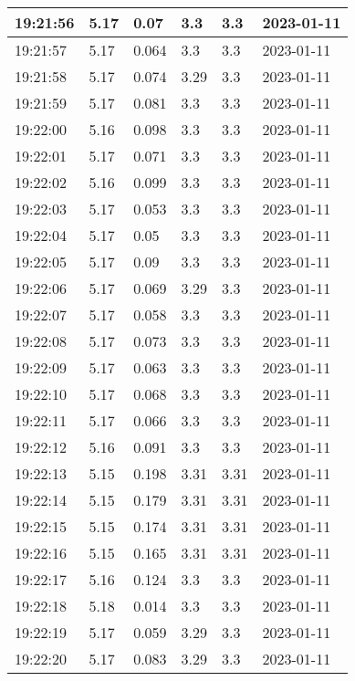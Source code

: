 \begin{longtable}{|l|l|l|l|l|l|}
        19:21:56 & 5.17 & 0.07 & 3.3 & 3.3 & 2023-01-11 \\ \hline
        19:21:57 & 5.17 & 0.064 & 3.3 & 3.3 & 2023-01-11 \\ \hline
        19:21:58 & 5.17 & 0.074 & 3.29 & 3.3 & 2023-01-11 \\ \hline
        19:21:59 & 5.17 & 0.081 & 3.3 & 3.3 & 2023-01-11 \\ \hline
        19:22:00 & 5.16 & 0.098 & 3.3 & 3.3 & 2023-01-11 \\ \hline
        19:22:01 & 5.17 & 0.071 & 3.3 & 3.3 & 2023-01-11 \\ \hline
        19:22:02 & 5.16 & 0.099 & 3.3 & 3.3 & 2023-01-11 \\ \hline
        19:22:03 & 5.17 & 0.053 & 3.3 & 3.3 & 2023-01-11 \\ \hline
        19:22:04 & 5.17 & 0.05 & 3.3 & 3.3 & 2023-01-11 \\ \hline
        19:22:05 & 5.17 & 0.09 & 3.3 & 3.3 & 2023-01-11 \\ \hline
        19:22:06 & 5.17 & 0.069 & 3.29 & 3.3 & 2023-01-11 \\ \hline
        19:22:07 & 5.17 & 0.058 & 3.3 & 3.3 & 2023-01-11 \\ \hline
        19:22:08 & 5.17 & 0.073 & 3.3 & 3.3 & 2023-01-11 \\ \hline
        19:22:09 & 5.17 & 0.063 & 3.3 & 3.3 & 2023-01-11 \\ \hline
        19:22:10 & 5.17 & 0.068 & 3.3 & 3.3 & 2023-01-11 \\ \hline
        19:22:11 & 5.17 & 0.066 & 3.3 & 3.3 & 2023-01-11 \\ \hline
        19:22:12 & 5.16 & 0.091 & 3.3 & 3.3 & 2023-01-11 \\ \hline
        19:22:13 & 5.15 & 0.198 & 3.31 & 3.31 & 2023-01-11 \\ \hline
        19:22:14 & 5.15 & 0.179 & 3.31 & 3.31 & 2023-01-11 \\ \hline
        19:22:15 & 5.15 & 0.174 & 3.31 & 3.31 & 2023-01-11 \\ \hline
        19:22:16 & 5.15 & 0.165 & 3.31 & 3.31 & 2023-01-11 \\ \hline
        19:22:17 & 5.16 & 0.124 & 3.3 & 3.3 & 2023-01-11 \\ \hline
        19:22:18 & 5.18 & 0.014 & 3.3 & 3.3 & 2023-01-11 \\ \hline
        19:22:19 & 5.17 & 0.059 & 3.29 & 3.3 & 2023-01-11 \\ \hline
        19:22:20 & 5.17 & 0.083 & 3.29 & 3.3 & 2023-01-11 \\ \hline

\end{longtable}
